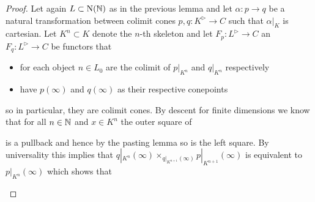 \begin{lemma}
\begin{proof}
        Let again $L\subset\operatorname{N}(\mathbb{N})$ as in the previous lemma and let $\alpha\colon p\to q$ be a natural transformation between colimit cones $p,q\colon K^{\rhd}\to C$ such that $\alpha|_K$ is cartesian.
        Let $K^n\subset K$ denote the $n$-th skeleton and let $F_p\colon L^{\rhd}\to C$ an $F_q\colon L^{\rhd}\to C$ be functors that 
        \begin{itemize}
            \item for each object $n\in L_0$ are the colimit of $p|_{K^n}$ and $q|_{K^n}$ respectively 
            \item have $p(\infty)$ and $q(\infty)$ as their respective conepoints
        \end{itemize}
        so in particular, they are colimit cones.
        By descent for finite dimensions we know that for all $n\in\mathbb{N}$ and $x\in K^n$ the outer square of
        \begin{center}
        \end{center}
        is a pullback and hence by the pasting lemma so is the left square.
        By universality this implies that $q|_{K^n}(\infty)\times_{q|_{K^{n+1}}(\infty)}p|_{K^{n+1}}(\infty)$ is equivalent to $p|_{K^n}(\infty)$ which shows that
        \begin{center}
\end{center}
\end{proof}
\end{lemma}
